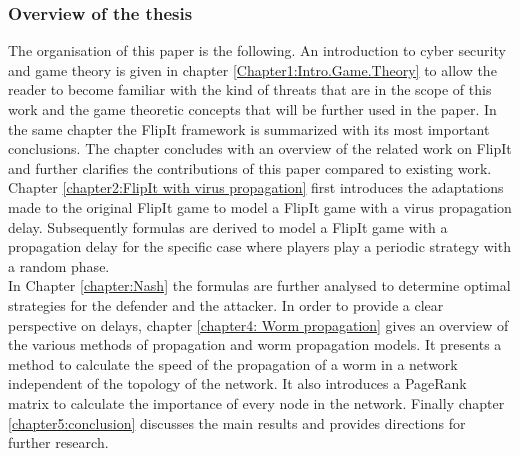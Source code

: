 %

\subsubsection{Overview of the thesis}

The organisation of this paper is the following.  An introduction to cyber security and game theory is given in chapter \ref{Chapter1:Intro.Game.Theory} to allow the reader to become familiar with the kind of threats that are in the scope of this work and the game theoretic concepts that will be further used in the paper. In the same chapter the FlipIt framework is summarized with its most important conclusions. The chapter concludes with an overview of the related work on FlipIt and further clarifies the contributions of this paper compared to existing work. 
Chapter \ref{chapter2:FlipIt with virus propagation} first introduces the adaptations made to the original FlipIt game to model a FlipIt game with a virus propagation delay. Subsequently formulas are derived to model a FlipIt game with a propagation delay for the specific case where players play a periodic strategy with a random phase. \\
In Chapter \ref{chapter:Nash} the formulas are further analysed to determine optimal strategies for the defender and the attacker.
In order to provide a clear perspective on delays, chapter \ref{chapter4: Worm propagation} gives an overview of the various methods of propagation and worm propagation models. It presents a method to calculate the speed of the propagation of a worm in a network independent of the topology of the network. It also introduces a PageRank matrix to calculate the importance of every node in the network.
Finally chapter \ref{chapter5:conclusion} discusses the main results and provides directions for further research.


